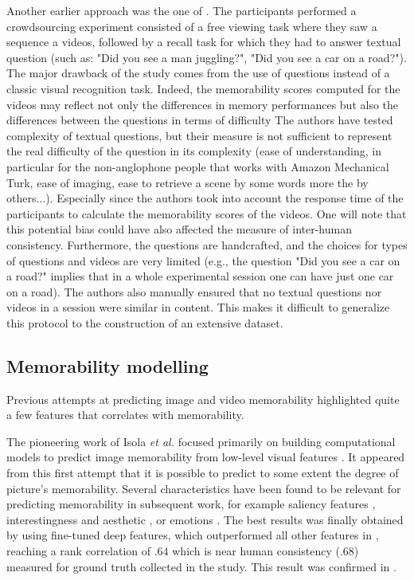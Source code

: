 \documentclass[sigconf]{acmart}
\begin{document}
Another earlier approach was the one of \cite{shekhar_2017_show}.
The participants performed a crowdsourcing experiment consisted of a free viewing task where they saw a sequence a videos, followed by a recall task for which they had to answer textual question (such as: "Did you see a man juggling?", "Did you see a car on a road?").
The major drawback of the study comes from the use of questions instead of a classic visual recognition task.
Indeed, the memorability scores computed for the videos may reflect not only the differences in memory performances but also the differences between the questions in terms of difficulty
The authors have tested complexity of textual questions, but their measure is not sufficient to represent the real difficulty of the question in its complexity (ease of understanding, in particular for the non-anglophone people that works with Amazon Mechanical Turk, ease of imaging, ease to retrieve a scene by some words more the by others...).
Especially since the authors took into account the response time of the participants to calculate the memorability scores of the videos.
One will note that this potential bias could have also affected the measure of inter-human consistency.
Furthermore, the questions are handcrafted, and the choices for types of questions and videos are very limited (e.g., the question "Did you see a car on a road?" implies that in a whole experimental session one can have just one car on a road).
The authors also manually ensured that no textual questions nor videos in a session were similar in content.
This makes it difficult to generalize this protocol to the construction of an extensive dataset.

\subsection{Memorability modelling}
Previous attempts at predicting image and video memorability highlighted quite a few features that correlates with memorability.

The pioneering work of Isola \textit{et al.} focused primarily on building computational models to predict image memorability from low-level visual features \cite{isola_2011_makes}.
It appeared from this first attempt that it is possible to predict to some extent the degree of picture's memorability.
Several characteristics have been found to be relevant for predicting memorability in subsequent work, for example saliency features \cite{mancas_2013_memorability}, interestingness and aesthetic \cite{isola_2014_makes}, or emotions \cite{khosla_2015_understanding}.
The best results was finally obtained by using fine-tuned deep features, which outperformed all other features in \cite{khosla_2015_understanding}, reaching a rank correlation of $.64$ which is near human consistency ($.68$) measured for ground truth collected in the study.
This result was confirmed in \cite{baveye_2016_deep,squalli_2017_deep}.
\end{document}
